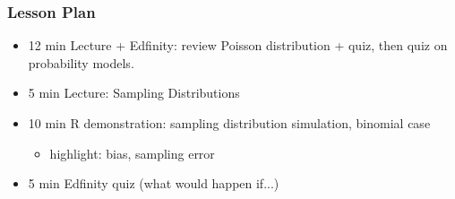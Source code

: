 

\begin{frame}
\frametitle{Lesson Plan}
\begin{itemize}
    \item 12 min Lecture + Edfinity: review Poisson distribution + quiz, then quiz on probability models.

    \item 5 min Lecture: Sampling Distributions
    \item 10 min R demonstration: sampling distribution simulation, binomial case
    \begin{itemize}
        \item  highlight: bias, sampling error
    \end{itemize}
    \item 5 min Edfinity quiz (what would happen if...)
    
\end{itemize}
\end{frame}


